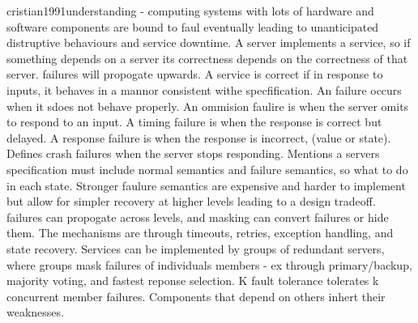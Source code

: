 cristian1991understanding - computing systems with lots of hardware and software components are bound to faul eventually leading to unanticipated distruptive behaviours and service downtime. A server implements a service, so if something depends on a server its correctness depends on the correctness of that server. failures will propogate upwards. A service is correct if in response to inputs, it behaves in a mannor consistent withe specfification. An failure occurs when it sdoes not behave properly. An ommision faulire is when the server omits to respond to an input. A timing failure is when the response is correct but delayed. A response failure is when the response is incorrect, (value or state). Defines crash failures when the server stops responding. Mentions a servers specification must include normal semantics and failure semantics, so what to do in each state. Stronger faulure semantics are expensive and harder to implement but allow for simpler recovery at higher levels leading to a design tradeoff. failures can propogate across levels, and masking can convert failures or hide them. The mechanisms are through timeouts, retries, exception handling, and state recovery. Services can be implemented by groups of redundant servers, where groups mask failures of individuals members - ex through primary/backup, majority voting, and fastest reponse selection. K fault tolerance tolerates k concurrent member failures. Components that depend on others inhert their weaknesses.










